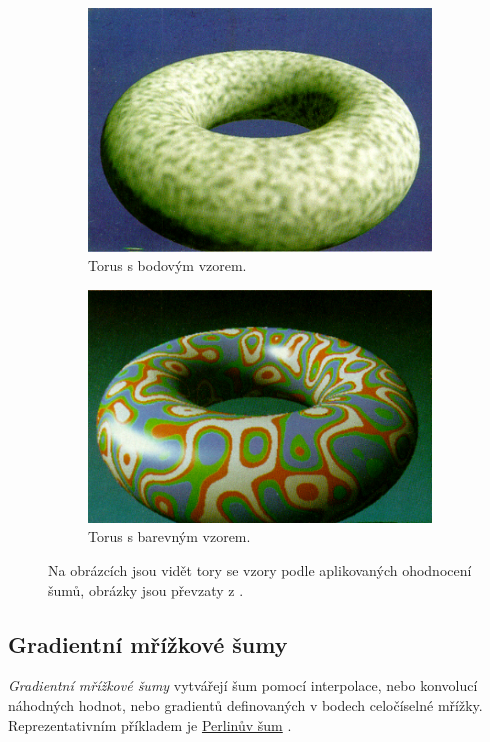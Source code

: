 \begin{figure}[H]
	\centering
	\begin{subfigure}{0.5\textwidth}
		\centering
		\includegraphics[scale=0.475]{obrazky-figures/SpottedDoughnut.png}
		\caption{Torus s bodovým vzorem.}
		\label{SpottedDoughnut}
	\end{subfigure}
	\begin{subfigure}{0.4\textwidth}
		\centering
		\includegraphics[scale=0.5]{obrazky-figures/ColoredDoughnut.png}
		\caption{Torus s barevným vzorem.}
		\label{ColoredDoughnut}
	\end{subfigure}
	\caption{Na obrázcích jsou vidět tory se vzory podle aplikovaných ohodnocení šumů, obrázky jsou převzaty z \cite{PerlinKen}.}
	\label{Doughnuts}
\end{figure}

\subsection{Gradientní mřížkové šumy}
\label{LatticeNoises}
\textit{Gradientní mřížkové šumy} vytvářejí šum pomocí interpolace, nebo konvolucí náhodných hodnot, nebo gradientů definovaných v bodech celočíselné mřížky. Reprezentativním příkladem je \hyperref[perlinNoise]{Perlinův šum} \cite{Lagae10}.

